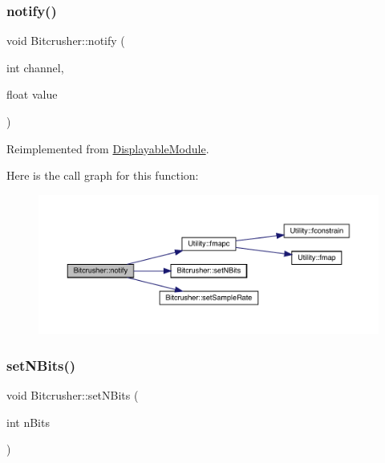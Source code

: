 \subsubsection{\texorpdfstring{notify()}{notify()}}
{\footnotesize\ttfamily void Bitcrusher\+::notify (\begin{DoxyParamCaption}\item[{int}]{channel,  }\item[{float}]{value }\end{DoxyParamCaption})\hspace{0.3cm}{\ttfamily [virtual]}}



Reimplemented from \mbox{\hyperlink{class_displayable_module_a8ae5383931f10c54cff2feef2bc07dee}{Displayable\+Module}}.

Here is the call graph for this function\+:\nopagebreak
\begin{figure}[H]
\begin{center}
\leavevmode
\includegraphics[width=350pt]{class_bitcrusher_ae392ad4b140a5121df417ece060911f4_cgraph}
\end{center}
\end{figure}
\mbox{\label{class_bitcrusher_a4c2ecf3d6fc604a9967685256a886503}} 
\subsubsection{\texorpdfstring{set\+N\+Bits()}{setNBits()}}
{\footnotesize\ttfamily void Bitcrusher\+::set\+N\+Bits (\begin{DoxyParamCaption}\item[{int}]{n\+Bits }\end{DoxyParamCaption})}

